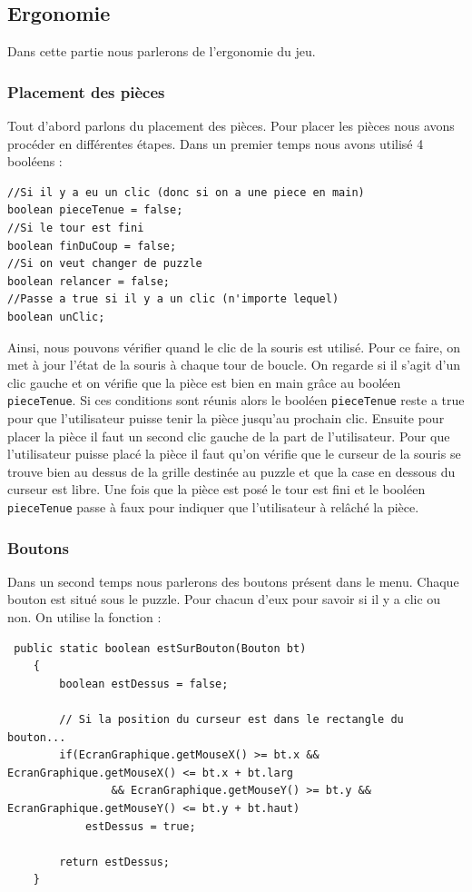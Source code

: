 \documentclass[]{article}
\newcommand{\variable}[1]{\noindent \texttt{#1}}
\begin{document}
\subsection{Ergonomie}

Dans cette partie nous parlerons de l'ergonomie du jeu.
\subsubsection{Placement des pièces}
Tout d'abord parlons du placement des pièces.
Pour placer les pièces nous avons procéder en différentes étapes. Dans un premier temps nous avons utilisé 4 booléens : 
\begin{lstlisting}
//Si il y a eu un clic (donc si on a une piece en main)
boolean pieceTenue = false;
//Si le tour est fini
boolean finDuCoup = false;
//Si on veut changer de puzzle
boolean relancer = false;
//Passe a true si il y a un clic (n'importe lequel)
boolean unClic;
\end{lstlisting}
Ainsi, nous pouvons vérifier quand le clic de la souris est utilisé. 
Pour ce faire, on met à jour l'état de la souris à chaque tour de boucle. On regarde si il s'agit d'un clic gauche et on vérifie que la pièce est bien en main grâce au booléen \variable{pieceTenue}. Si ces conditions sont réunis alors le booléen \variable{pieceTenue} reste a true pour que l'utilisateur puisse tenir la pièce jusqu'au prochain clic. Ensuite pour placer la pièce il faut un second clic gauche de la part de  l'utilisateur.
Pour que l'utilisateur puisse placé la pièce il faut qu'on vérifie que le curseur de la souris se trouve bien au dessus de la grille destinée au puzzle et que la case en dessous du curseur est libre.  Une fois que la pièce est posé le tour est fini et le booléen \variable{pieceTenue} passe à faux pour indiquer que l'utilisateur à relâché la pièce.

\subsubsection{Boutons}
Dans un second temps nous parlerons des boutons présent dans le menu. 
Chaque bouton est situé sous le puzzle.  Pour chacun d'eux pour savoir si il y a clic ou non. On utilise la fonction : 
\begin{lstlisting}
 public static boolean estSurBouton(Bouton bt)
    {
        boolean estDessus = false;

        // Si la position du curseur est dans le rectangle du bouton...
        if(EcranGraphique.getMouseX() >= bt.x && EcranGraphique.getMouseX() <= bt.x + bt.larg
                && EcranGraphique.getMouseY() >= bt.y && EcranGraphique.getMouseY() <= bt.y + bt.haut)
            estDessus = true;

        return estDessus;
    }
\end{lstlisting}
\end{document}
